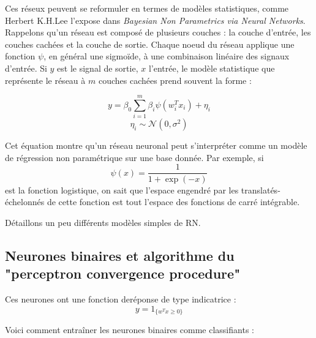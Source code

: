 \documentclass{article}
\theoremstyle{definition}
\begin{document}
Ces réseux peuvent se reformuler en termes de modèles statistiques, comme Herbert K.H.Lee l'expose dans \textit{Bayesian Non Parametrics via Neural Networks}. Rappelons qu'un réseau est composé de plusieurs couches : la couche d'entrée, les couches cachées et la couche de sortie. Chaque noeud du réseau applique une fonction $\psi$, en général une sigmoïde, à une combinaison linéaire des signaux d'entrée. Si $y$ est le signal de sortie, $x$ l'entrée, le modèle statistique que représente le réseau à $m$ couches cachées prend souvent la forme :

\[y=\beta_0 \sum_{i=1}^m \beta_i\psi(w_i^T x_i) + \eta_i\]
\[\eta_i \sim \mathcal N(0,\sigma^2)\]

Cet équation montre qu'un réseau neuronal peut s'interpréter comme un modèle de régression non paramétrique sur une base donnée. Par exemple, si 
\[\psi(x)=\frac{1}{1+\exp(-x)}\]
est la fonction logistique, on sait que l'espace engendré par les translatés-échelonnés de cette fonction est tout l'espace des fonctions de carré intégrable.


Détaillons un peu différents modèles simples de RN.

 \subsection{Neurones binaires et algorithme du "perceptron convergence procedure"}
Ces neurones ont une fonction deréponse de type indicatrice :
\[y=1_{\{w^Tx\geq 0\}}\]

Voici comment entraîner les neurones binaires comme classifiants :\\

\\
\\
\end{document}
